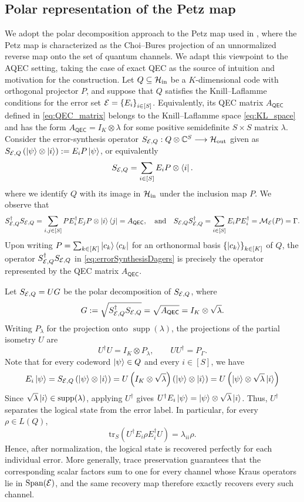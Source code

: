\documentclass[10pt]{article}
\DeclareMathOperator{\supp}{supp}
\DeclareMathOperator{\Span}{Span}
\newcommand{\SIN}{\mathrm{in}}
\newcommand{\SOUT}{\mathrm{out}}
\newcommand{\tr}{\mathrm{tr}}
\newcommand{\C}{\mathbb{C}}
\newcommand{\p}[1]{\left(#1\right)}
\newcommand{\ppp}[1]{\left\{#1\right\}}
\newcommand{\s}[1]{\mathsf{#1}}
\begin{document}
\subsection{Polar representation of the Petz map}
We adopt the polar decomposition approach to the Petz map used in \cite{afham2026projections}, where the Petz map is characterized as the Choi--Bures projection of an unnormalized reverse map onto the set of quantum channels. We adapt this viewpoint to the AQEC setting, taking the case of exact QEC as the source of intuition and motivation for the construction.  Let $Q\subseteq\calH_{\SIN}$ be a $K$-dimensional code with orthogonal projector $P$, and suppose that $Q$ satisfies the Knill--Laflamme conditions for the error set $\calE=\ppp{E_i}_{i\in[S]}$. Equivalently, its QEC matrix $A_{\s{QEC}}$ defined in \eqref{eq:QEC_matrix} belongs to the Knill--Laflamme space \eqref{eq:KL_space} and has the form $A_{\s{QEC}}=I_K\otimes\lambda$ for some positive semidefinite $S\times S$ matrix $\lambda$. Consider the error-synthesis operator $S_{\calE,Q}:Q\otimes\C^S\longrightarrow\calH_{\SOUT}$ given as $S_{\calE,Q}\p{ \ket{\psi}\otimes\ket{i}} :=E_iP\ket{\psi}$, or equivalently
\begin{equation}
     S_{{\cal E},Q}=\sum_{i\in [S]} E_i P \otimes \bra{i}. \label{eq:ErrorSynthDef}
\end{equation}
where we identify $Q$ with its image in $\calH_{\SIN}$ under the inclusion map $P$. We observe that
\begin{equation}
S_{\calE,Q}^{\dag}S_{\calE,Q} =\sum_{i,j\in[S]} PE_i^\dag E_jP\otimes\ket{i}\bra{j}=A_{\s{QEC}}, \quad \text{and}\quad S_{\calE,Q}S_{\calE,Q}^{\dag}=\sum_{i\in[S]}E_iPE_i^\dag=\calM_{\calE}(P)=\Gamma.
\label{eq:errorSynthesisDagers}
\end{equation}
Upon writing $P=\sum_{k\in[K]}\ket{c_k}\bra{c_k}$
for an orthonormal basis $\ppp{\ket{c_k}}_{k\in[K]}$ of $Q$, the operator $S_{{\cal E},Q}^\dag S_{{\cal E},Q}$ in \eqref{eq:errorSynthesisDagers} is precisely the operator represented by the QEC matrix $A_{\s{QEC}}$. 

Let $S_{{\cal E},Q}=UG$ be the polar decomposition of $S_{{\cal E},Q}$, where
\[G := \sqrt{S_{\calE,Q}^{\dag}S_{\calE,Q}} = \sqrt{A_{\s{QEC}}} = I_K\otimes\sqrt{\lambda}. \]
Writing $P_{\lambda}$ for the projection onto $\supp(\lambda)$, the projections 
of the partial isometry $U$ are
\[ U^\dag U=I_K\otimes P_{\lambda}, \qquad UU^\dag=P_{\Gamma}.\]
Note that for every codeword $\ket{\psi}\in Q$ and every $i\in[S]$, we have
\[E_i\ket{\psi}= S_{\calE,Q}\p{\ket{\psi}\otimes\ket{i}}=
U\p{I_K\otimes\sqrt{\lambda}}
\p{\ket{\psi}\otimes\ket{i}}=
U\p{\ket{\psi}\otimes\sqrt{\lambda}\ket{i}} \]
Since $\sqrt{\lambda}\ket{i}\in\supp(\lambda)$, applying $U^\dag$ gives $U^\dag E_i\ket{\psi} = \ket{\psi}\otimes\sqrt{\lambda}\ket{i}$.
Thus, $U^\dag$ 
separates the logical state from the error label. In particular, for every $\rho\in L(Q)$,
\[ \tr_S\p{U^\dag E_i\rho E_i^\dag U} = \lambda_{ii}\rho. \]
Hence, after normalization, the logical state is recovered perfectly for each individual error. More generally, trace preservation guarantees that the corresponding scalar factors sum to one for every channel whose Kraus operators lie in $\Span(\calE)$, and the same recovery map therefore exactly recovers every such channel.
\end{document}
